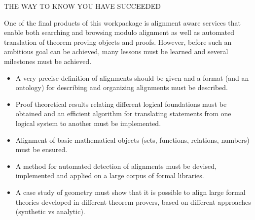 {\color{red} THE WAY TO KNOW YOU HAVE SUCCEEDED }

One of the final products of this workpackage is alignment aware services
that enable both searching and browsing modulo alignment as well as
automated translation of theorem proving objects and proofs.  However,
before such an ambitious goal can be achieved, many lessons must be
learned and several milestones must be achieved.
\begin{itemize}
\item A very precise definition of alignments should be given and a
  format (and an ontology) for describing and organizing alignments
  must be described.
\item Proof theoretical results relating different logical foundations
  must be obtained and an efficient algorithm for translating
  statements from one logical system to another must be implemented.
\item Alignment of basic mathematical objects (sets, functions,
  relations, numbers) must be ensured.
\item A method for automated detection of alignments must be devised,
  implemented and applied on a large corpus of formal libraries.
\item A case study of geometry must show that it is possible to align
  large formal theories developed in different theorem provers, based
  on different approaches (synthetic vs analytic).
\end{itemize}



